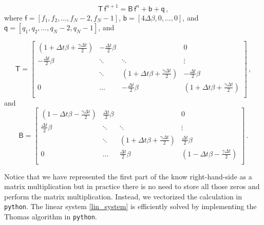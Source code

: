 \documentclass[11pt]{article}
\newcommand{\com}{\, ,}
\newcommand{\per}{\, .}
\def\beq{\begin{equation}}
\def\eeq{\end{equation}}
\begin{document}
\beq
\label{lin_system}
\mathsf{T}\,\mathsf{f}^{n+1} = \mathsf{B\,}\mathsf{f}^{n} + \mathsf{b} + \mathsf{q}\com
\eeq
where $\mathsf{f} = [f_1,f_2,\ldots,f_N-2,f_N-1]$, $\mathsf{b}= [4\Delta\beta,0,\ldots,0]$, and $\mathsf{q} = [q_1,q_2,\ldots,q_N-2,q_N-1]$, and

\begin{equation} \label{matrixT}
    \mathsf{T} = \left[ \begin{matrix}
            \left(1 + \Delta t \beta + \tfrac{\gamma \Delta t}{2}\right) & -\tfrac{\Delta t}{2}\beta & &0\\
            -\tfrac{\Delta t}{2}\beta& \ddots & \ddots &  \vdots\\
                                     & \ddots & \left(1 + \Delta t \beta + \tfrac{\gamma \Delta t}{2}\right)  &-\tfrac{\Delta t}{2}\beta \\
                              0       &\ldots &-\tfrac{\Delta t}{2}\beta &\left(1 + \Delta t \beta + \tfrac{\gamma \Delta t}{2}\right)  \\
    \end{matrix} \right]\com
\end{equation}
and
\begin{equation} \label{matrixB}
    \mathsf{B} = \left[ \begin{matrix}
            \left(1 - \Delta t \beta - \tfrac{\gamma \Delta t}{2}\right) & \tfrac{\Delta t}{2}\beta & &0\\
            \tfrac{\Delta t}{2}\beta& \ddots & \ddots  & \vdots\\
                                     & \ddots & \left(1 + \Delta t \beta + \tfrac{\gamma \Delta t}{2}\right)  &\tfrac{\Delta t}{2}\beta \\
                              0       &\ldots &\tfrac{\Delta t}{2}\beta &\left(1 - \Delta t \beta - \tfrac{\gamma \Delta t}{2}\right)  \\
    \end{matrix} \right]\per
\end{equation}

Notice that we have represented the first part of the  know right-hand-side as a matrix multiplication but in practice there is no need to store all those zeros and perform the matrix multiplication. Instead, we vectorized the calculation in \texttt{python}. The linear system  \eqref{lin_system} is efficiently solved by implementing the Thomas algorithm in \texttt{python}.
\end{document}
